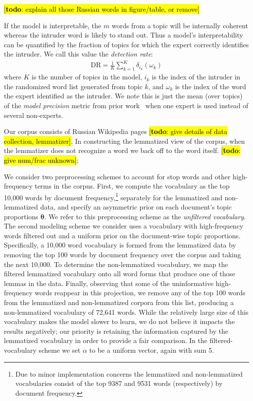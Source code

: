 \documentclass[11pt,letterpaper]{article}
\renewcommand{\vec}{\boldsymbol}   %
\newcommand{\vtheta}{{\vec{\theta}}}
\newcommand{\dirac}[2]{\delta_{#1}\left(#2\right)}
\newcommand{\DR}{\ensuremath{\textrm{DR}}}
\newcommand{\Note}[3]{\sethlcolor{#2}\hl{[\textbf{#1}: #3]}}
\newcommand{\todo}[1]{\Note{todo}{lightred}{#1}}
\begin{document}
{\todo{explain all those Russian words in figure/table, or remove}

If the model is interpretable, the $m$ words from a topic will be
internally coherent whereas the intruder word is likely to stand out.
Thus a model's interpretability can be quantified by the fraction
of topics for which the expert correctly identifies the intruder.  We
call this value the \emph{detection rate}:
\begin{align*}
    \DR = \frac{1}{K} \sum_{k=1}^K \dirac{i_k}{\omega_k}
\end{align*}
where $K$ is the number of topics in the model, $i_k$ is the index
of the intruder in the randomized word list generated from topic $k$,
and $\omega_k$ is the index of the word the expert identified as the
intruder.  We note this is just the mean (over topics) of the
\emph{model precision} metric from prior work~\cite{chang2009}
when one expert is used instead of several non-experts.

Our corpus consists of Russian Wikipedia pages
\todo{give details of data collection, lemmatizer}.
In constructing the lemmatized view of the corpus, when the lemmatizer
does not recognize a word we back off to the word itself.
\todo{give num/frac unknown};

We consider two preprocessing schemes to account for stop words and
other high-frequency terms in the corpus.  First, we compute the
vocabulary as the top 10,000 words by document frequency,\footnote{
    Due to minor implementation concerns the lemmatized and
    non-lemmatized vocabularies consist of the top 9387 and 9531 words
    (respectively) by document frequency.
}
separately for the lemmatized and non-lemmatized data, and
specify an asymmetric prior on each document's topic proportions
$\vtheta$.
We refer to this preprocessing scheme
as the \emph{unfiltered vocabulary}.  The second modeling scheme we
consider uses a vocabulary with high-frequency words filtered out and a
uniform prior on the document-wise topic proportions.
Specifically, a 10,000 word vocabulary is formed from the
lemmatized data by removing the top 100 words by document frequency
over the corpus and taking the next 10,000.  To determine the
non-lemmatized vocabulary, we map the filtered lemmatized
vocabulary onto all word forms that produce one of those lemmas in
the data.  Finally, observing that some of the uninformative
high-frequency words reappear in this projection, we remove any
of the top 100 words from the lemmatized and non-lemmatized corpora
from this list, producing a non-lemmatized vocabulary of 72,641 words.
While the relatively large size of this vocabulary makes the model
slower to learn, we do not believe it impacts the results negatively;
our priority is retaining the information captured by the lemmatized
vocabulary in order to provide a fair comparison.
In the filtered-vocabulary scheme we set $\alpha$ to be a uniform
vector, again with sum 5.

}
\end{document}
